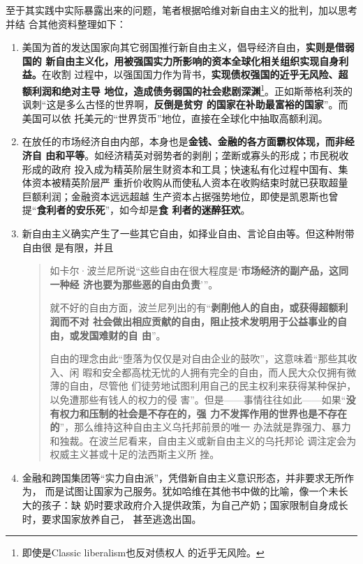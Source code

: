 至于其实践中实际暴露出来的问题，笔者根据哈维对新自由主义的批判，加以思考并结
合其他资料整理如下：
\begin{enumerate}
\item 美国为首的发达国家向其它弱国推行新自由主义，倡导经济自由，\textbf{实则是借弱国的
    新自由主义化，用被强国实力所影响的资本全球化相关组织实现自身利益。}在收割
  过程中，以强国国力作为背书，\textbf{实现债权强国的近乎无风险、超额利润和绝对主导
    地位，造成债务弱国的社会悲剧深渊}\footnote{即使是Classic liberalism也反对债权人
    的近乎无风险。}。正如斯蒂格利茨的讽刺“这是多么古怪的世界啊，\textbf{反倒是贫穷
    的国家在补助最富裕的国家}”。而美国可以依
  托美元的“世界货币”地位，直接在全球化中抽取高额利润。


\item 在放任的市场经济自由内部，本身也是\textbf{金钱、金融的各方面霸权体现，而非经济自
    由和平等}。如经济精英对弱势者的剥削；垄断或寡头的形成；市民税收形成的政府
  投入成为精英阶层生财资本和工具；快速私有化过程中国有、集体资本被精英阶层严
  重折价收购从而使私人资本在收购结束时就已获取超量巨额利润；金融资本远远超越
  生产资本占据强势地位，即使是凯恩斯也曾提“\textbf{食利者的安乐死}”，如今却是\textbf{食
    利者的迷醉狂欢}。

\item 新自由主义确实产生了一些其它自由，如择业自由、言论自由等。但这种附带自由很
  是有限，并且
  \begin{quotation}
    如卡尔·波兰尼所说“这些自由在很大程度是‘\textbf{市场经济的副产品，这同一种经
      济也要为那些恶的自由负责}’”。

    就不好的自由方面，波兰尼列出的有“\textbf{剥削他人的自由，或获得超额利润而不对
      社会做出相应贡献的自由，阻止技术发明用于公益事业的自由，或发国难财的自
      由}”。

    自由的理念由此“堕落为仅仅是对自由企业的鼓吹”，这意味着“那些其收入、闲
    暇和安全都高枕无忧的人拥有完全的自由，而人民大众仅拥有微薄的自由，尽管他
    们徒劳地试图利用自己的民主权利来获得某种保护，以免遭那些有钱人的权力的侵
    害”。但是——事情往往如此——如果“\textbf{没有权力和压制的社会是不存在的，强
      力不发挥作用的世界也是不存在的}”，那么维持这种自由主义乌托邦前景的唯一
    办法就是靠强力、暴力和独裁。在波兰尼看来，自由主义或新自由主义的乌托邦论
    调注定会为权威主义甚或十足的法西斯主义所
    挫。 
  \end{quotation}

\item 金融和跨国集团等“实力自由派”，凭借新自由主义意识形态，并非要求无所作为，
  而是试图让国家为己服务。犹如哈维在其他书中做的比喻，像一个未长大的孩子：缺
  奶时要求政府介入提供政策，为自己产奶；国家限制自身成长时，要求国家放养自己，
  甚至逃逸出国。



\end{enumerate}
